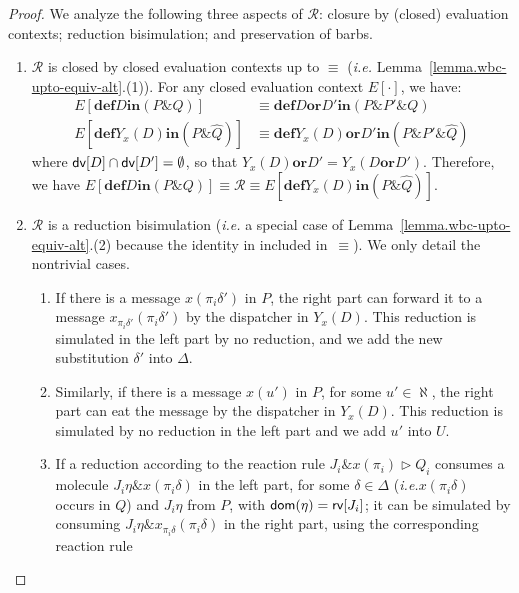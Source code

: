 \documentclass{LMCS}
\makeatletter
\newcommand{\pt}{\pi}
\newcommand{\ie}{\emph{i.e.}\@\xspace}
\newcommand{\kwd}[1]{\ensuremath{\mathbf{#1}}}
\newcommand{\prefix}[1]{\mathopen{}\mathrel{\kwd {#1}}}
\newcommand{\infix}[1]{\mathrel{\kwd {#1}}}
\renewcommand{\_}{\mathord{\rule[-.25ex]{1ex}{.15ex}}}
\newcommand{\para}[2]{#1\mathop{\&}#2}
\newcommand{\dis}[2]{#1\infix{or}#2}
\newcommand{\define}[2]{\prefix{def} #1 \infix{in} #2}
\newcommand{\reaction}[2]{#1 \triangleright #2}
\newcommand{\R}{\mathrel{\mathcal{R}}}
\newcommand{\econtext}[1]{E[#1]}
\newcommand{\dv}[1]{\mbox{\sf dv}[#1]}
\newcommand{\rv}[1]{\mbox{\sf rv}[#1]}
\def \dom #1{\mbox{\sf dom}(#1)}
\newcommand{\bisi}[1]{\widehat{#1}}
\makeatother
\begin{document}
\begin{proof}
  We analyze the following three aspects of $\R$: closure by (closed)
  evaluation contexts; reduction bisimulation; and preservation of barbs.

  \begin{enumerate}[$\bullet$]
  \item $\R$ is closed by closed evaluation contexts up to $\equiv$
    (\ie Lemma~\ref{lemma.wbc-upto-equiv-alt}.(1)). For any closed
    evaluation context $\econtext{\cdot}$, we have:
    \begin{align*}
      \econtext{\define{D}{(\para{P}{Q})}} &\equiv 
      \define{\dis{D}{D'}}{(\para{\para{P}{P'}}{Q})} \\
      \econtext{\define{Y_x(D)}{(\para{P}{\bisi{Q}})}} &\equiv
      \define{\dis{Y_x(D)}{D'}}{(\para{\para{P}{P'}}{\bisi{Q}})}
    \end{align*}
    where $\dv{D} \cap \dv{D'} = \emptyset$, so that $\dis{Y_x(D)}{D'} =
    Y_x(\dis{D}{D'})$. Therefore, we have
    $\econtext{\define{D}{(\para{P}{Q})}} \equiv\R\equiv
    \econtext{\define{Y_x(D)}{(\para{P}{\bisi{Q}})}} $.
  \item $\R$ is a reduction bisimulation (\ie a special case of
    Lemma~\ref{lemma.wbc-upto-equiv-alt}.(2) because the identity in
    included in~$\equiv$). We only detail the nontrivial cases.
    \begin{enumerate}[(1)]
    \item If there is a message $x({\pt_i}{\delta'})$ in $P$, the
      right part can forward it to a message
      $x_{{{\pt_i}{\delta'}}}({\pt_i}{\delta'})$ by the dispatcher
      in $Y_x(D)$. This reduction is simulated in the left part by no
      reduction, and we add the new substitution $\delta'$ into
      $\Delta$.
    \item\label{2} Similarly, if there is a message $x(u')$ in $P$,
      for some $u' \in \aleph$, the right part can eat the message by
      the dispatcher in $Y_x(D)$. This reduction is simulated by no
      reduction in the left part and we add $u'$ into $U$.
    \item If a reduction according to the reaction rule
      $\reaction{\para{J_i}{x(\pt_i)}}{Q_i}$ consumes a molecule
      $\para{{J_i}{\eta}}{x({\pt_i}{\delta})}$ in the left part, for
      some $\delta \in \Delta$ (\ie $x({\pt_i}{\delta})$
      occurs in $Q$) and $J_i\eta$ from $P$, with
      $\dom{\eta}=\rv{J_i}$; it can be simulated by consuming
      $\para{{J_i}{\eta}}{x_{{{\pt_i}{\delta}}}({\pt_i}{\delta})}$ in
      the right part, using the corresponding reaction rule

\end{enumerate}
\end{enumerate}
\end{proof}
\end{document}
